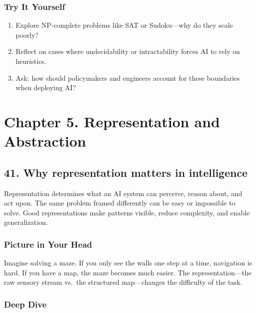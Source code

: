 \documentclass[
  letterpaper,
  DIV=11,
  numbers=noendperiod]{scrreprt}
\providecommand{\tightlist}{%
  \setlength{\itemsep}{0pt}\setlength{\parskip}{0pt}}
\begin{document}
\subsubsection{Try It Yourself}\label{try-it-yourself-39}

\begin{enumerate}
\def\labelenumi{\arabic{enumi}.}
\tightlist
\item
  Explore NP-complete problems like SAT or Sudoku---why do they scale
  poorly?
\item
  Reflect on cases where undecidability or intractability forces AI to
  rely on heuristics.
\item
  Ask: how should policymakers and engineers account for these
  boundaries when deploying AI?
\end{enumerate}

\section{Chapter 5. Representation and
Abstraction}\label{chapter-5.-representation-and-abstraction}

\subsection{41. Why representation matters in
intelligence}\label{why-representation-matters-in-intelligence}

Representation determines what an AI system can perceive, reason about,
and act upon. The same problem framed differently can be easy or
impossible to solve. Good representations make patterns visible, reduce
complexity, and enable generalization.

\subsubsection{Picture in Your Head}\label{picture-in-your-head-40}

Imagine solving a maze. If you only see the walls one step at a time,
navigation is hard. If you have a map, the maze becomes much easier. The
representation---the raw sensory stream vs.~the structured map---changes
the difficulty of the task.

\subsubsection{Deep Dive}\label{deep-dive-40}
\end{document}
